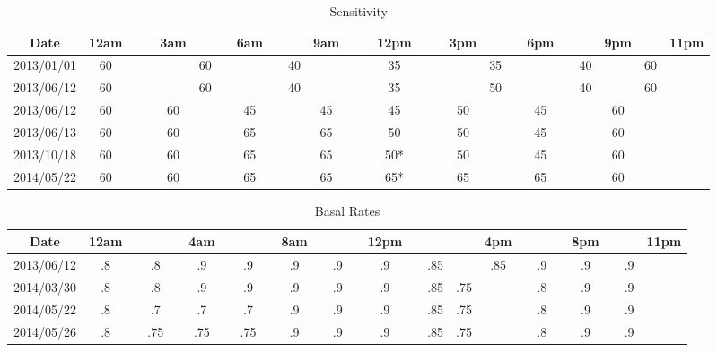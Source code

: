 \begin{table}[h]
\caption{Sensitivity}
\footnotesize
\begin{center}
\begin{tabular}{|c|c|c|c|c|c|c|c|c|c|c|c|c|c|c|c|c|c|c|c|c|c|c|c|c|}
\hline
Date       & 12am & & & 3am &    & &6am & &    & 9am & & & 12pm & & & 3pm &    & & 6pm & &    & 9pm &    & 11pm \\ \hline
2013/01/01 & 60   & & &     & 60 & &    & & 40 &     & & & 35   & & &     & 35 & &     & & 40 &     & 60 &      \\
2013/06/12 & 60   & & &     & 60 & &    & & 40 &     & & & 35   & & &     & 50 & &     & & 40 &     & 60 &      \\
2013/06/12 & 60   & & & 60  &    & & 45 & &    & 45  & & & 45   & & & 50  &    & & 45  & &    & 60  &    &      \\
2013/06/13 & 60   & & & 60  &    & & 65 & &    & 65  & & & 50   & & & 50  &    & & 45  & &    & 60  &    &      \\
2013/10/18 & 60   & & & 60  &    & & 65 & &    & 65  & & & 50*  & & & 50  &    & & 45  & &    & 60  &    &      \\
2014/05/22 & 60   & & & 60  &    & & 65 & &    & 65  & & & 65*  & & & 65  &    & & 65  & &    & 60  &    &      \\
\hline
\end{tabular}
\end{center}
\label{default}
\end{table}%

\begin{table}[h]
\caption{Basal Rates}
\footnotesize
\begin{center}
\begin{tabular}{|c|c|c|c|c|c|c|c|c|c|c|c|c|c|c|c|c|c|c|c|c|c|c|c|c|}
\hline
Date       & 12am & &    & & 4am & &    & & 8am & &    & & 12pm & &     &     & 4pm & &    & & 8pm & &    & 11pm \\ \hline
2013/06/12 & .8   & & .8 & & .9  & & .9 & & .9  & & .9 & & .9   & & .85 &     & .85 & & .9 & & .9  & & .9 &      \\
2014/03/30 & .8   & & .8 & & .9  & & .9 & & .9  & & .9 & & .9   & & .85 & .75 &     & & .8 & & .9  & & .9 &      \\
2014/05/22 & .8   & & .7 & & .7  & & .7 & & .9  & & .9 & & .9   & & .85 & .75 &     & & .8 & & .9  & & .9 &      \\
2014/05/26 & .8   & & .75& & .75 & & .75& & .9  & & .9 & & .9   & & .85 & .75 &     & & .8 & & .9  & & .9 &      \\
\hline
\end{tabular}
\end{center}
\label{default}
\end{table}%

